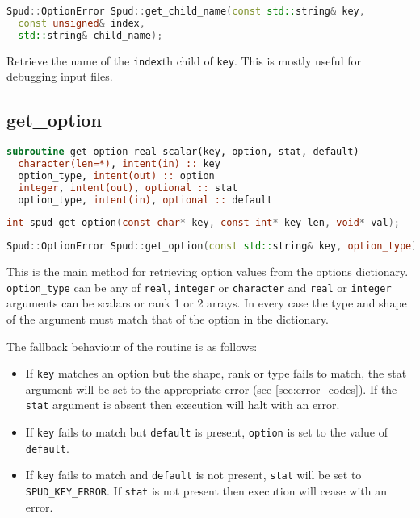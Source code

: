 \documentclass[a4paper, 11pt]{book}
\begin{document}
\begin{lstlisting}[language=C++]
Spud::OptionError Spud::get_child_name(const std::string& key, 
  const unsigned& index, 
  std::string& child_name); 
\end{lstlisting}

Retrieve the name of the \lstinline+index+th child of \lstinline+key+. This
is mostly useful for debugging input files.

\subsection{get\_option}

\begin{lstlisting}[language=fortran,emph=option_type,emphstyle=\textit]
subroutine get_option_real_scalar(key, option, stat, default)
  character(len=*), intent(in) :: key
  option_type, intent(out) :: option
  integer, intent(out), optional :: stat
  option_type, intent(in), optional :: default
\end{lstlisting}

\begin{lstlisting}[language=C,emph=option_type,emphstyle=\textit]
int spud_get_option(const char* key, const int* key_len, void* val);
\end{lstlisting}

\begin{lstlisting}[language=C++,emph=option_type,emphstyle=\textit]
Spud::OptionError Spud::get_option(const std::string& key, option_type);
\end{lstlisting}

This is the main method for retrieving option values from the options
dictionary. \lstinline[emph=option_type,emphstyle=\textit]+option_type+ can
be any of \lstinline+real+, \lstinline+integer+ or
\lstinline+character+ and \lstinline+real+ or \lstinline+integer+ arguments can be
scalars or rank 1 or 2 arrays. In every case the type and shape of the
argument must match that of the option in the dictionary.

The fallback behaviour of the routine is as follows:
\begin{itemize}
\item If \lstinline+key+ matches an option but the shape, rank or type fails
  to match, the stat argument will be set to the appropriate error (see
  \ref{sec:error_codes}). If the \lstinline+stat+ argument is absent then execution
  will halt with an error.
\item If \lstinline+key+ fails to match but \lstinline+default+ is present,
  \lstinline+option+ is set to the value of \lstinline+default+.
\item If \lstinline+key+ fails to match and \lstinline+default+ is not
  present, \lstinline+stat+ will be set to \lstinline+SPUD_KEY_ERROR+. If
  \lstinline+stat+ is not present then execution will cease with an error.
\end{itemize}
\end{document}
